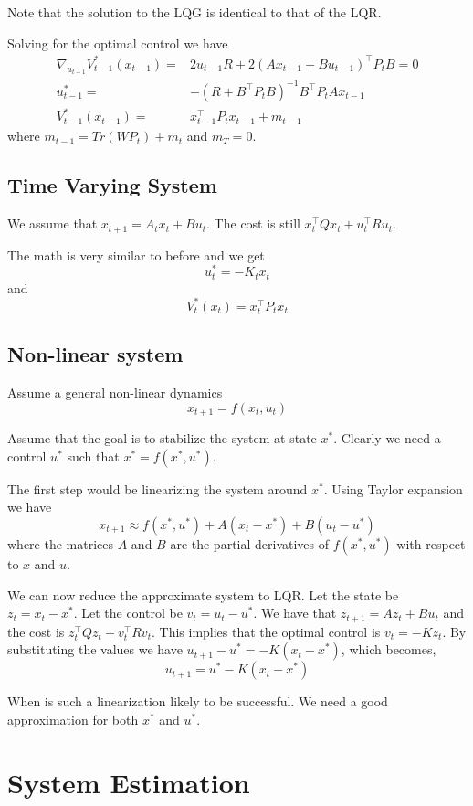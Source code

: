 Note that the solution to the LQG is identical to that of the LQR.

Solving for the optimal control we have
\begin{align*}
\nabla_{u_{t-1}} V^*_{t-1}(x_{t-1}) =&
2u_{t-1}R+2(Ax_{t-1}+Bu_{t-1})^\top P_t B =0\\
u_{t-1}^*=& -(R+B^\top P_t B)^{-1}B^\top P_t Ax_{t-1}\\
V^*_{t-1}(x_{t-1})=&x_{t-1}^\top P_t x_{t-1} + m_{t-1}
\end{align*}
where $m_{t-1}=Tr(WP_t)+m_t$ and $m_T=0$.

\subsection{Time Varying System}

We assume that $x_{t+1}=A_t x_t +B u_t$. The cost is still $x_t^\top
Qx_t+u_t^\top Ru_t$.

The math is very similar to before and we get
\[
u_t^*=-K_t x_t
\]
and
\[
V^*_t(x_t)=x_t^\top P_t x_t
\]

\subsection{Non-linear system}

Assume a general non-linear dynamics
\[
x_{t+1}=f(x_t,u_t)
\]

Assume that the goal is to stabilize the system at state $x^*$.
Clearly we need a control $u^*$ such that $x^*=f(x^*,u^*)$.

The first step would be linearizing the system around $x^*$. Using
Taylor expansion we have
\[
x_{t+1}\approx f(x^*,u^*)+A(x_t-x^*)+B(u_t-u^*)
\]
where the matrices $A$ and $B$ are the partial derivatives of
$f(x^*,u^*)$ with respect to $x$ and $u$.

We can now reduce the approximate system to LQR. Let the state be
$z_t=x_t-x^*$. Let the control be $v_t=u_t-u^*$. We have that
$z_{t+1}=Az_t + Bu_t$ and the cost is $z_t^\top Qz_t+v_t^\top Rv_t$.
This implies that the optimal control is $v_t = -Kz_t$. By
substituting the values we have $u_{t+1}-u^*=-K(x_{t}-x^*)$, which
becomes,
\[
u_{t+1}=u^*-K(x_t-x^*)
\]

When is such a linearization likely to be successful. We need a good
approximation for both $x^*$ and $u^*$.

\section{System Estimation}

